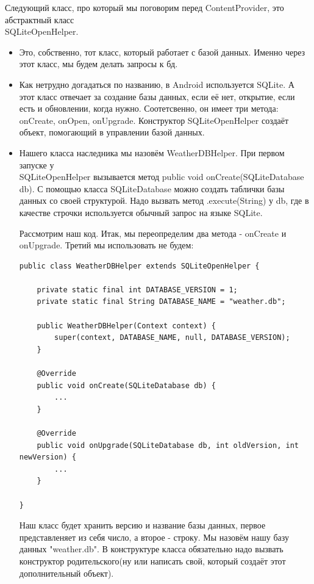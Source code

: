 \documentclass[12 pt]{article}
\begin{document}
	Следующий класс, про который мы поговорим перед ContentProvider, это абстрактный класс \\ SQLiteOpenHelper.
	\begin{itemize}
	    \item Это, собственно, тот класс, который работает с базой данных. Именно через этот класс, мы будем делать запросы к бд.
	    \item Как нетрудно догадаться по названию, в Android используется SQLite. А этот класс отвечает за создание базы данных, если её нет, открытие, если есть и обновлении, когда нужно. Соотетсвенно, он имеет три метода: onCreate, onOpen, onUpgrade. Конструктор SQLiteOpenHelper создаёт объект, помогающий в управлении базой данных.
	    \item Нашего класса наследника мы назовём WeatherDBHelper. При первом запуске у \\ SQLiteOpenHelper вызывается метод public void onCreate(SQLiteDatabase db). С помощью класса SQLiteDatabase можно создать таблички базы данных со своей структурой. Надо вызвать метод .execute(String) у db, где в качестве строчки используется обычный запрос на языке SQLite.
	    
	    Рассмотрим наш код. Итак, мы переопределим два метода - onCreate и onUpgrade. Третий мы использовать не будем:
	    \begin{lstlisting}
public class WeatherDBHelper extends SQLiteOpenHelper {

    private static final int DATABASE_VERSION = 1;
    private static final String DATABASE_NAME = "weather.db";

    public WeatherDBHelper(Context context) {
        super(context, DATABASE_NAME, null, DATABASE_VERSION);
    }

    @Override
    public void onCreate(SQLiteDatabase db) {
        ...
    }

    @Override
    public void onUpgrade(SQLiteDatabase db, int oldVersion, int newVersion) {
        ...
    }

}	    
	    \end{lstlisting}
	    	    
        Наш класс будет хранить версию и название базы данных, первое представленяет из себя число, а второе - строку. Мы назовём нашу базу данных "weather.db". В конструктуре класса обязательно надо вызвать конструктор родительского(ну или написать свой, который создаёт этот дополнительный объект).
        

\end{itemize}
\end{document}
